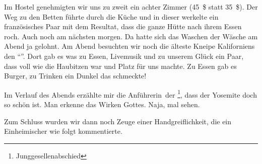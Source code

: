 Im Hostel  genehmigten wir uns zu zweit ein achter Zimmer (45~\$ statt 35~\$).
Der Weg zu den Betten führte durch die Küche und in dieser werkelte ein französisches Paar mit dem Resultat, dass die ganze Hütte nach ihrem Essen roch.
Auch noch am nächsten morgen.
Da hatte sich das Waschen der Wäsche am Abend ja gelohnt.
Am Abend besuchten wir noch die älteste Kneipe Kaliforniens den ``''.
Dort gab es was zu Essen, Livemusik und zu unserem Glück ein Paar, dass voll wie die Haubitzen war und Platz für uns machte.
Zu Essen gab es Burger, zu Trinken ein Dunkel das schmeckte!

Im Verlauf des Abends erzählte mir die \glqq Anführerin\grqq \, der \footnote{Junggesellenabschied}, dass der Yosemite doch so schön ist.
Man erkenne das Wirken Gottes.
Naja, mal sehen.

Zum Schluss wurden wir dann noch Zeuge einer Handgreiflichkeit, die ein Einheimischer wie folgt kommentierte.

\begin{quote}
\end{quote}
